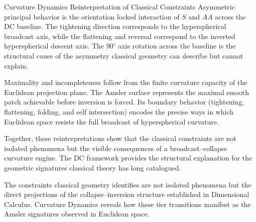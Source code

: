 \documentclass[final,onefignum,onetabnum]{siamart}
\begin{document}
\begin{section}{Curvature Dynamics Reinterpretation of Classical Constraints}
Asymmetric principal behavior is the orientation locked interaction of $S$ and $AA$ across the DC baseline. The tightening direction corresponds to the hyperspherical broadcast axis, while the flattening and reversal correspond to the inverted hyperspherical descent axis. The $90^\circ$ axis rotation across the baseline is the structural cause of the asymmetry classical geometry can describe but cannot explain.

Maximality and incompleteness follow from the finite curvature capacity of the Euclidean projection plane. The Amsler surface represents the maximal smooth patch achievable before inversion is forced. Its boundary behavior (tightening, flattening, folding, and self intersection) encodes the precise ways in which Euclidean space resists the full broadcast of hyperspherical curvature.

Together, these reinterpretations show that the classical constraints are not isolated phenomena but the visible consequences of a broadcast–collapse curvature engine. The DC framework provides the structural explanation for the geometric signatures classical theory has long catalogued.

The constraints classical geometry identifies are not isolated phenomena but the direct projections of the collapse–inversion structure established in Dimensional Calculus. Curvature Dynamics reveals how these tier transitions manifest as the Amsler signatures observed in Euclidean space.
\end{section}
\end{document}
